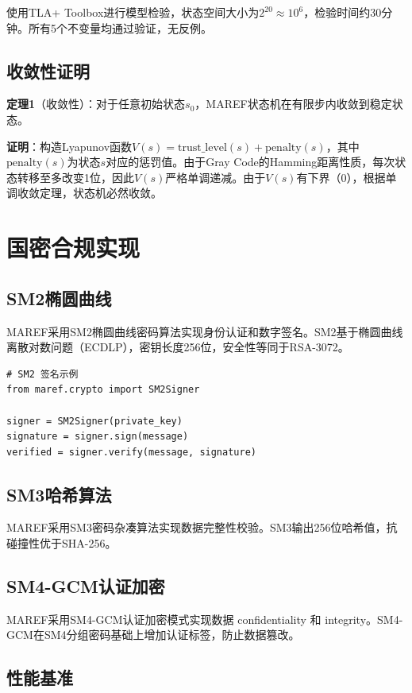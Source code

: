使用TLA+ Toolbox进行模型检验，状态空间大小为$2^{20} \approx 10^6$，检验时间约30分钟。所有5个不变量均通过验证，无反例。

\subsection{收敛性证明}

\textbf{定理1}（收敛性）：对于任意初始状态$s_0$，MAREF状态机在有限步内收敛到稳定状态。

\textbf{证明}：构造Lyapunov函数$V(s) = \text{trust\_level}(s) + \text{penalty}(s)$，其中$\text{penalty}(s)$为状态$s$对应的惩罚值。由于Gray Code的Hamming距离性质，每次状态转移至多改变1位，因此$V(s)$严格单调递减。由于$V(s)$有下界（0），根据单调收敛定理，状态机必然收敛。

\section{国密合规实现}

\subsection{SM2椭圆曲线}

MAREF采用SM2椭圆曲线密码算法实现身份认证和数字签名。SM2基于椭圆曲线离散对数问题（ECDLP），密钥长度256位，安全性等同于RSA-3072。

\begin{verbatim}
# SM2 签名示例
from maref.crypto import SM2Signer

signer = SM2Signer(private_key)
signature = signer.sign(message)
verified = signer.verify(message, signature)
\end{verbatim}

\subsection{SM3哈希算法}

MAREF采用SM3密码杂凑算法实现数据完整性校验。SM3输出256位哈希值，抗碰撞性优于SHA-256。

\subsection{SM4-GCM认证加密}

MAREF采用SM4-GCM认证加密模式实现数据 confidentiality 和 integrity。SM4-GCM在SM4分组密码基础上增加认证标签，防止数据篡改。

\subsection{性能基准}


